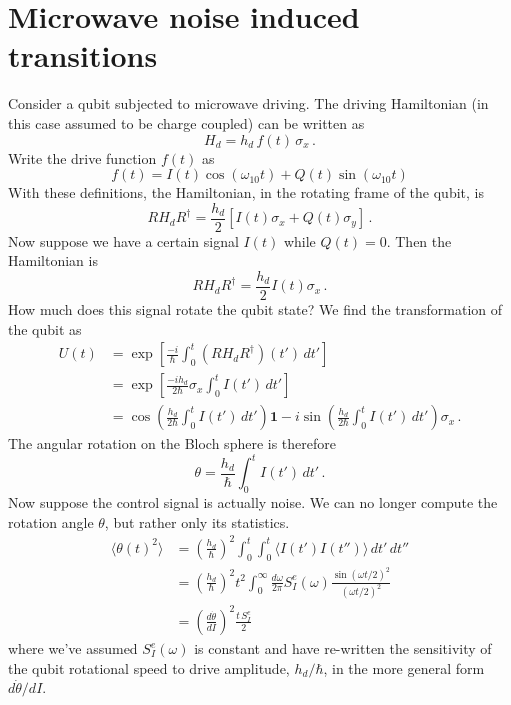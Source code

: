 \section{Microwave noise induced transitions}

Consider a qubit subjected to microwave driving.
The driving Hamiltonian (in this case assumed to be charge coupled) can be written as
\begin{equation}
H_d = h_d \, f(t) \, \sigma_x \, .
\end{equation}
Write the drive function $f(t)$ as
\begin{equation}
f(t) = I(t) \cos (\omega_{10} t) + Q(t) \sin(\omega_{10} t)
\end{equation}
With these definitions, the Hamiltonian, in the rotating frame of the qubit, is
\begin{equation}
R H_d R^\dagger = \frac{h_d}{2} \left[ I(t) \sigma_x + Q(t) \sigma_y \right] \, .
\end{equation}
Now suppose we have a certain signal $I(t)$ while $Q(t) = 0$.
Then the Hamiltonian is
\begin{equation}
R H_d R^\dagger = \frac{h_d}{2} I(t) \sigma_x \, .
\end{equation}
How much does this signal rotate the qubit state?
We find the transformation of the qubit as
\begin{align}
U(t)
&= \exp \left[ \frac{-i}{\hbar} \int_0^t (R H_d R^\dagger)(t') \, dt' \right] \\
&= \exp \left[ \frac{-i h_d}{2 \hbar} \sigma_x \int_0^t I(t')\,dt' \right] \\
&= \cos \left( \frac{h_d}{2 \hbar} \int_0^t I(t')\,dt' \right) \mathbf{1}
- i \sin \left( \frac{h_d}{2 \hbar} \int_0^t I(t')\,dt' \right) \sigma_x \, .
\end{align}
The angular rotation on the Bloch sphere is therefore
\begin{equation}
\theta = \frac{h_d}{\hbar} \int_0^t I(t')\,dt' \, .
\end{equation}
Now suppose the control signal is actually noise.
We can no longer compute the rotation angle $\theta$, but rather only its statistics.
\begin{align}
\langle \theta(t)^2 \rangle
&= \left( \frac{h_d}{\hbar} \right)^2 \int_0^t \int_0^t \langle I(t')I(t'') \rangle \,
dt' \, dt'' \\
&= \left( \frac{h_d}{\hbar} \right)^2 t^2
\int_0^\infty \frac{d\omega}{2 \pi} S^e_I(\omega) \frac{\sin(\omega t / 2)^2}{(\omega t/2)^2} \\
&= \left( \frac{d \dot{\theta}}{d I} \right)^2 \frac{t \, S_I^e}{2} \label{eq:ch.decoherence.sec.microwave_noise_induced_transitions:theta_squared}
\end{align}
where we've assumed $S_I^e(\omega)$ is constant and have re-written the sensitivity of the qubit rotational speed to drive amplitude, $h_d/\hbar$, in the more general form $d \dot{\theta} / dI$.

